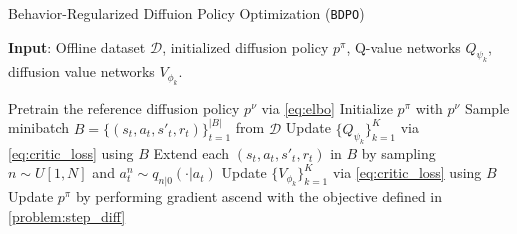 \begin{algorithm}[t]
\caption{Behavior-Regularized Diffuion Policy Optimization (\texttt{BDPO})}
\label{code}
\textbf{Input}: Offline dataset $\mathcal{D}$, initialized diffusion policy $p^\pi$, Q-value networks $Q_{\psi_k}$, diffusion value networks $V_{\phi_k}$.

\begin{algorithmic}[1]
\STATE Pretrain the reference diffusion policy $p^\nu$ via \eqref{eq:elbo}
\STATE Initialize $p^\pi$ with $p^\nu$
\STATE Sample minibatch $B=\{(s_t, a_t, s'_t, r_t)\}_{t=1}^{|B|}$ from $\mathcal{D}$
\STATE Update $\{Q_{\psi_k}\}_{k=1}^K$ via \eqref{eq:critic_loss} using $B$
\STATE Extend each $(s_t,a_t,s'_t,r_t)$ in $B$ by sampling $n\sim U[1, N]$ and $a^{n}_t\sim q_{n|0}(\cdot|a_t)$
\STATE Update $\{V_{\phi_k}\}_{k=1}^K$ via \eqref{eq:critic_loss} using $B$
\STATE Update $p^\pi$ by performing gradient ascend with the objective defined in \eqref{problem:step_diff}
\ENDIF
\ENDFOR
\end{algorithmic}
\end{algorithm}
